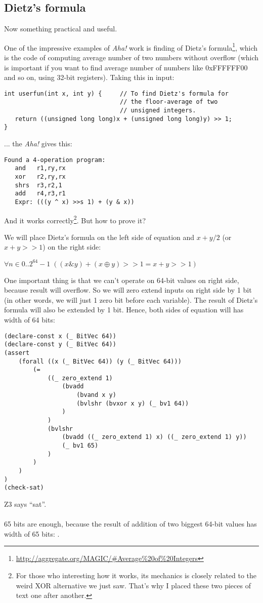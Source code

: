 \subsection{Dietz's formula}

Now something practical and useful.

One of the impressive examples of \textit{Aha!} work is finding of Dietz's formula\footnote{\url{http://aggregate.org/MAGIC/\#Average\%20of\%20Integers}},
which is the code of computing average number of two numbers without overflow (which is important if you want to find average number of numbers like 0xFFFFFF00 and so on, using 32-bit registers).
Taking this in input:

\begin{lstlisting}
int userfun(int x, int y) {     // To find Dietz's formula for
                                // the floor-average of two
                                // unsigned integers.
   return ((unsigned long long)x + (unsigned long long)y) >> 1;
}
\end{lstlisting}

... the \textit{Aha!} gives this:

\begin{lstlisting}
Found a 4-operation program:
   and   r1,ry,rx
   xor   r2,ry,rx
   shrs  r3,r2,1
   add   r4,r3,r1
   Expr: (((y ^ x) >>s 1) + (y & x))
\end{lstlisting}

And it works correctly\footnote{For those who interesting how it works, its mechanics is closely related to the weird XOR alternative we just saw.
That's why I placed these two pieces of text one after another.}.
But how to prove it?

We will place Dietz's formula on the left side of equation and $x+y/2$ (or $x+y>>1$) on the right side:

\begin{center}
$\forall n \in 0..2^{64}-1\; ( (x\&y) + (x \oplus y)>>1 = x+y>>1)$
\end{center}

One important thing is that we can't operate on 64-bit values on right side, because result will overflow.
So we will zero extend inputs on right side by 1 bit (in other words, we will just 1 zero bit before each variable).
The result of Dietz's formula will also be extended by 1 bit.
Hence, both sides of equation will has width of 64 bits:

\begin{lstlisting}
(declare-const x (_ BitVec 64))
(declare-const y (_ BitVec 64))
(assert 
	(forall ((x (_ BitVec 64)) (y (_ BitVec 64)))
		(=
			((_ zero_extend 1)
				(bvadd
					(bvand x y)
					(bvlshr (bvxor x y) (_ bv1 64))
				)
			)
			(bvlshr
				(bvadd ((_ zero_extend 1) x) ((_ zero_extend 1) y))
				(_ bv1 65)
			)
		)
	)
)
(check-sat)
\end{lstlisting}

Z3 says ``sat''.\\
\\
65 bits are enough, because the result of addition of two biggest 64-bit values has width of 65 bits: .


